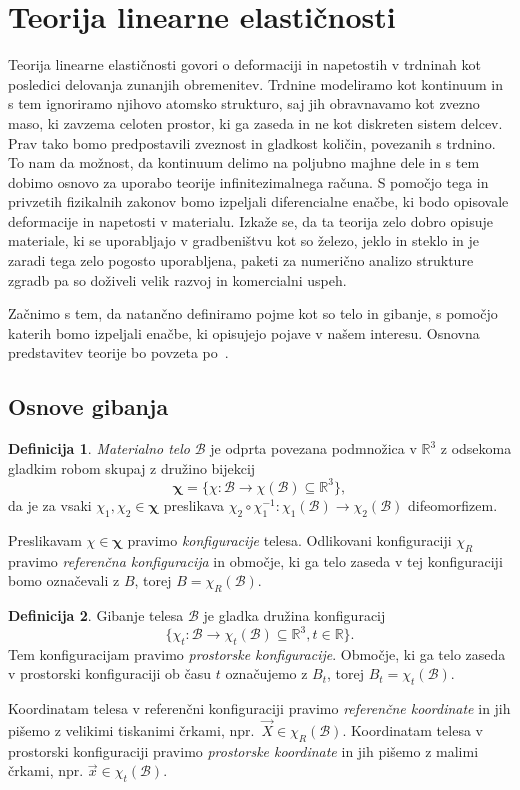 \documentclass[a4paper,twoside]{article}
\theoremstyle{definition} %
\newtheorem{definicija}{Definicija}[section]
\theoremstyle{plain} %
\numberwithin{equation}{section}
\newcommand{\R}{\mathbb R}
\newcommand{\B}{\mathcal{B}}
\renewcommand{\b}{\boldsymbol}
\newcommand{\vX}{\vec{X}}
\newcommand{\vx}{\vec{x}}
\begin{document}
\section{Teorija linearne elastičnosti}
\label{sec:mehanika}
Teorija linearne elastičnosti govori o deformaciji in napetostih v trdninah kot
posledici delovanja zunanjih obremenitev. Trdnine modeliramo kot kontinuum in
s tem ignoriramo njihovo atomsko strukturo, saj jih obravnavamo kot zvezno maso,
ki zavzema celoten prostor, ki ga zaseda in ne kot diskreten sistem delcev. Prav
tako bomo predpostavili zveznost in gladkost količin, povezanih s trdnino. To
nam da možnost, da kontinuum delimo na poljubno majhne dele in s tem dobimo
osnovo za uporabo teorije infinitezimalnega računa. S pomočjo tega in privzetih
fizikalnih zakonov bomo izpeljali diferencialne enačbe, ki bodo opisovale
deformacije in napetosti v materialu. Izkaže se, da ta teorija zelo dobro
opisuje materiale, ki se uporabljajo v gradbeništvu kot so železo, jeklo in
steklo in je zaradi tega zelo pogosto uporabljena, paketi za numerično analizo
strukture zgradb pa so doživeli velik razvoj in komercialni uspeh.

Začnimo s tem, da natančno definiramo pojme kot so telo in gibanje, s pomočjo
katerih bomo izpeljali enačbe, ki opisujejo pojave v našem interesu. Osnovna
predstavitev teorije bo povzeta po~\cite{slaughter2012linearized}.

\subsection{Osnove gibanja}

\begin{definicija}
  \emph{Materialno telo} $\B$ je odprta povezana podmnožica v $\R^3$ z odsekoma gladkim
  robom skupaj z družino bijekcij
  \[
    \b\chi = \{\chi \colon\B\to\chi(\B) \subseteq \R^3\},
  \]
  da je za vsaki $\chi_1, \chi_2 \in \b\chi$ preslikava
  $\chi_2\circ\chi_1^{-1}\colon \chi_1(\B) \to \chi_2(\B)$
  difeomorfizem.

  Preslikavam $\chi \in \b\chi$ pravimo \emph{konfiguracije} telesa. Odlikovani
  konfiguraciji $\chi_R$ pravimo \emph{referenčna konfiguracija} in območje, ki
  ga telo zaseda v tej konfiguraciji bomo označevali z $B$, torej $B =
  \chi_R(\B)$.
\end{definicija}

\begin{definicija}
  \label{def:gibanje}
  Gibanje telesa $\B$ je gladka družina konfiguracij
  \[
    \{\chi_t\colon \B \to\chi_t(\B) \subseteq \R^3, t \in \R\}.
  \]
  Tem konfiguracijam pravimo \emph{prostorske konfiguracije}. Območje, ki ga
  telo zaseda v prostorski konfiguraciji ob času $t$ označujemo z $B_t$, torej
  $B_t = \chi_t(\B)$.
\end{definicija}
Koordinatam telesa v referenčni konfiguraciji pravimo \emph{referenčne
koordinate} in jih pišemo z velikimi tiskanimi črkami, npr.\ $\vX \in \chi_R(\B)$.
Koordinatam telesa v prostorski konfiguraciji pravimo \emph{prostorske
koordinate} in jih pišemo z malimi črkami, npr. $\vx \in \chi_t(\B)$.
\end{document}
